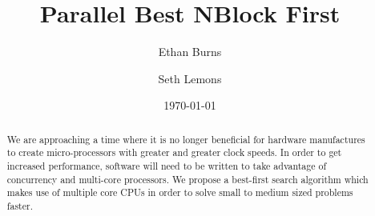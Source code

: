 \documentclass{article}
\title{Parallel Best NBlock First}
\author{Ethan Burns \and Seth Lemons}
\date{\today}
\begin{document}
\maketitle

\begin{abstract}
We are approaching a time where it is no longer beneficial for
hardware manufactures to create micro-processors with greater and
greater clock speeds.  In order to get increased performance, software
will need to be written to take advantage of concurrency and
multi-core processors.  We propose a best-first search algorithm which
makes use of multiple core CPUs in order to solve small to medium
sized problems faster.
\end{abstract}
\end{document}
